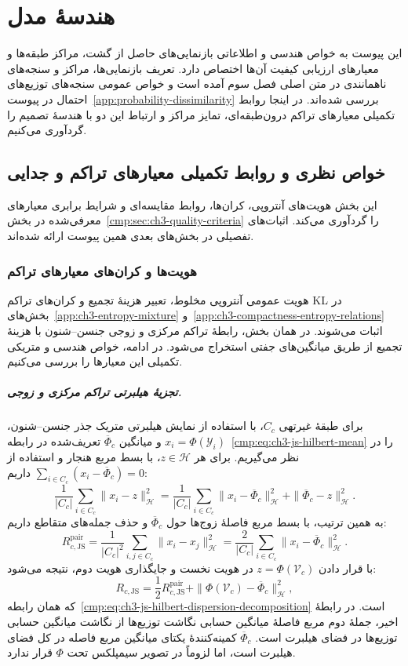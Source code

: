 \chapter{هندسهٔ مدل}
\label{app:model-geometry}

این پیوست به خواص هندسی و اطلاعاتی بازنمایی‌های حاصل از گشت، مراکز طبقه‌ها و معیارهای ارزیابی کیفیت آن‌ها اختصاص دارد. تعریف بازنمایی‌ها، مراکز و سنجه‌های ناهمانندی در متن اصلی فصل سوم آمده است و خواص عمومی سنجه‌های توزیع‌های احتمال در پیوست~\ref{app:probability-dissimilarity} بررسی شده‌اند. در اینجا روابط تکمیلی معیارهای تراکم درون‌طبقه‌ای، تمایز مراکز و ارتباط این دو با هندسهٔ تصمیم را گردآوری می‌کنیم.

\section{خواص نظری و روابط تکمیلی معیارهای تراکم و جدایی}
\label{cmp:sec:ch3-quality-criteria-theory}
این بخش هویت‌های آنتروپی، کران‌ها، روابط مقایسه‌ای و شرایط برابری معیارهای معرفی‌شده در بخش~\ref{cmp:sec:ch3-quality-criteria} را گردآوری می‌کند. اثبات‌های تفصیلی در بخش‌های بعدی همین پیوست ارائه شده‌اند.

\subsection{هویت‌ها و کران‌های معیارهای تراکم}
هویت عمومی آنتروپی مخلوط، تعبیر هزینهٔ تجمیع و
کران‌های تراکم KL در بخش‌های~\ref{app:ch3-entropy-mixture}
و~\ref{app:ch3-compactness-entropy-relations} اثبات
می‌شوند. در همان بخش، رابطهٔ تراکم مرکزی و زوجی
جنسن--شنون با هزینهٔ تجمیع از طریق میانگین‌های جفتی
استخراج می‌شود. در ادامه، خواص هندسی و متریکی
تکمیلی این معیارها را بررسی می‌کنیم.

\paragraph{تجزیهٔ هیلبرتی تراکم مرکزی و زوجی.}
\label{app:geometry-js-hilbert-dispersion}
برای طبقهٔ غیرتهی $C_c$، با استفاده از نمایش هیلبرتی
متریک جذر جنسن--شنون، $x_i=\Phi(\mathscr Y_i)$ و
میانگین $\overline{\Phi}_c$ تعریف‌شده در
رابطه~\eqref{cmp:eq:ch3-js-hilbert-mean} را در نظر می‌گیریم. برای هر $z\in\mathcal H$، با بسط
مربع هنجار و استفاده از
$\sum_{i\in C_c}(x_i-\overline{\Phi}_c)=0$ داریم:
\[
\frac1{|C_c|}\sum_{i\in C_c}\|x_i-z\|_{\mathcal H}^{2}
=\frac1{|C_c|}\sum_{i\in C_c}\|x_i-\overline{\Phi}_c\|_{\mathcal H}^{2}
+\|\overline{\Phi}_c-z\|_{\mathcal H}^{2}.
\]
به همین ترتیب، با بسط مربع فاصلهٔ زوج‌ها حول
$\overline{\Phi}_c$ و حذف جمله‌های متقاطع داریم:
\[
R_{c,\mathrm{JS}}^{\mathrm{pair}}
=\frac1{|C_c|^2}\sum_{i,j\in C_c}\|x_i-x_j\|_{\mathcal H}^{2}
=\frac2{|C_c|}\sum_{i\in C_c}\|x_i-\overline{\Phi}_c\|_{\mathcal H}^{2}.
\]
با قرار دادن $z=\Phi(\mathcal V_c)$ در هویت نخست
و جایگذاری هویت دوم، نتیجه می‌شود:
\[
R_{c,\mathrm{JS}}=\frac12R_{c,\mathrm{JS}}^{\mathrm{pair}}
+\|\Phi(\mathcal V_c)-\overline{\Phi}_c\|_{\mathcal H}^{2},
\]
که همان رابطه~\eqref{cmp:eq:ch3-js-hilbert-dispersion-decomposition} است.
در رابطهٔ اخیر، جملهٔ دوم مربع فاصلهٔ میانگین حسابی نگاشت توزیع‌ها
از نگاشت میانگین حسابی توزیع‌ها در فضای هیلبرت است.
$\overline{\Phi}_c$ کمینه‌کنندهٔ یکتای میانگین مربع
فاصله در کل فضای هیلبرت است، اما لزوماً در تصویر
سیمپلکس تحت $\Phi$ قرار ندارد.

